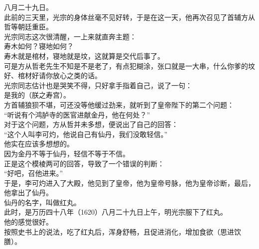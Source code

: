 \begin{multicols}{\theparacolNo}
八月二十九日。\\

此前的三天里，光宗的身体丝毫不见好转，于是在这一天，他再次召见了首辅方从哲等朝廷重臣。\\

光宗同志这次很清醒，一上来就直奔主题：\\

寿木如何？寝地如何？\\

寿木就是棺材，寝地就是坟，这就算是交代后事了。\\

可是方从哲老先生不知是不是老了，有点犯糊涂，张口就是一大串，什么你爹的坟好、棺材好请你放心之类的话。\\

光宗同志估计也是哭笑不得，只好拿手指着自己，说了一句：\\

是我的（朕之寿宫）。\\

方首辅狼狈不堪，可还没等他缓过劲来，就听到了皇帝陛下的第二个问题：\\

“听说有个鸿胪寺的医官进献金丹，他在何处？”\\

对于这个问题，方从哲并未多想，便说出了自己的回答：\\

“这个人叫李可灼，他说自己有仙丹，我们没敢轻信。”\\

他实在应该多想想的。\\

因为金丹不等于仙丹，轻信不等于不信。\\

正是这个模棱两可的回答，导致了一个错误的判断：\\

“好吧，召他进来。”\\

于是，李可灼进入了大殿，他见到了皇帝，他为皇帝号脉，他为皇帝诊断，最后，他拿出了仙丹。\\

仙丹的名字，叫做红丸。\\

此时，是万历四十八年（1620）八月二十九日上午，明光宗服下了红丸。\\

他的感觉很好。\\

按照史书上的说法，吃了红丸后，浑身舒畅，且促进消化，增加食欲（思进饮膳）。\\


\end{multicols}
